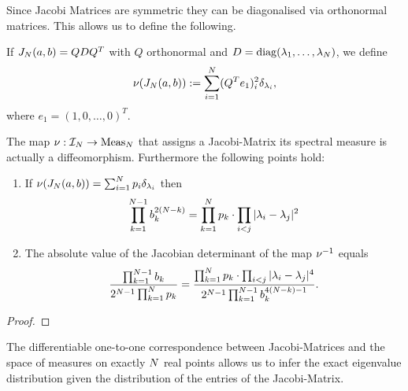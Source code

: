 Since Jacobi Matrices are symmetric they can be diagonalised via orthonormal matrices. This allows us to define the following.

\begin{definition}
    If $J_N(a,b) = QDQ^T$ with $Q$ orthonormal and $D = \operatorname{diag}(\lambda_1, \ldots, \lambda_N)$, we define
    \begin{align*}
        \nu(J_N(a,b)) := \sum_{i=1}^{N} (Q^T e_1)^2_i \delta_{\lambda_i},
    \end{align*}
    where $e_1 = (1,0,\ldots,0)^T$.
\end{definition}

\begin{theorem}\label{trafoTheorem}
    The map $\nu: \mathcal{I}_N \to \operatorname{Meas}_N$ that assigns a Jacobi-Matrix its spectral measure is actually a diffeomorphism. Furthermore the following points hold:
    \begin{enumerate}[label=(\alph*)]
        \item If $\nu(J_N(a,b)) = \sum_{i=1}^N p_i \delta_{\lambda_i}$ then
        \begin{align}
            \prod_{k=1}^{N-1} b_k^{2(N-k)} = \prod_{k=1}^N p_k \cdot \prod_{i<j} |\lambda_i - \lambda_j|^2
        \end{align}
        \item The absolute value of the Jacobian determinant of the map $\nu^{-1}$ equals
        \begin{align}\label{inverseSpectralDet}
            \frac{\prod_{k=1}^{N-1} b_k}{2^{N-1} \prod_{k=1}^N p_k} = \frac{\prod_{k=1}^N p_k \cdot \prod_{i<j} |\lambda_i - \lambda_j|^4}{2^{N-1} \prod_{k=1}^{N-1} b_k^{4(N - k)-1}}.
        \end{align}
    \end{enumerate}
\end{theorem}
\begin{proof}
\end{proof}

The differentiable one-to-one correspondence between Jacobi-Matrices and the space of measures on exactly $N$ real points allows us to infer the exact eigenvalue distribution given the distribution of the entries of the Jacobi-Matrix.

